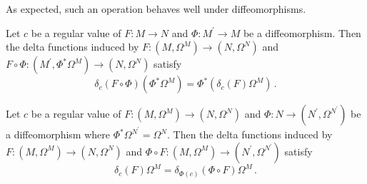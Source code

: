 As expected, such an operation behaves well under diffeomorphisms.
\begin{lemma}\label{diffeoProperty}
Let $c$ be a regular value of $F:M\rightarrow N$ and $\Phi:M^{'}\rightarrow M$ be a diffeomorphism.  Then the delta functions induced by $F:(M,\Omega^M)\rightarrow (N,\Omega^N)$ and $F\circ\Phi:(M^{'},\Phi^*\Omega^M)\rightarrow  (N,\Omega^N)$ satisfy
\begin{equation}
\delta_c(F\circ\Phi)(\Phi^*\Omega^M)=\Phi^*(\delta_c(F)\Omega^M)\,.
\end{equation}
\end{lemma}

\begin{lemma}
Let $c$ be a regular value of $F:(M,\Omega^M)\rightarrow (N,\Omega^N)$ and $\Phi:N\rightarrow (N^{'},\Omega^{N^{'}})$ be a diffeomorphism where $\Phi^*\Omega^{N^{'}}=\Omega^N$.  Then the delta functions induced by $F:(M,\Omega^M)\rightarrow (N,\Omega^N)$ and $\Phi\circ F:(M,\Omega^M)\rightarrow (N^{'},\Omega^{N^{'}})$ satisfy
\begin{equation}
\delta_c(F)\Omega^M=\delta_{\Phi(c)}(\Phi\circ F)\Omega^M\,.
\end{equation}
\end{lemma}

